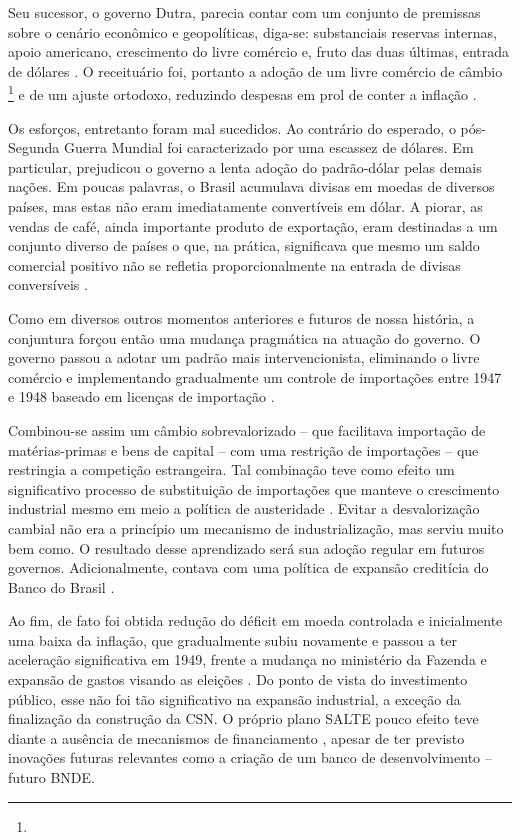 Seu sucessor, o governo Dutra, parecia contar com um conjunto de premissas
sobre o cenário econômico e geopolíticas, diga-se: substanciais reservas internas, apoio
americano, crescimento do livre comércio e, fruto das duas últimas,
entrada de dólares \citep{vianna_o_2025}. O receituário foi, portanto a
adoção de um livre comércio de câmbio \footnote{} e de um ajuste ortodoxo,
reduzindo despesas em prol de conter a inflação .

Os esforços, entretanto foram mal sucedidos. Ao contrário do esperado, o
pós-Segunda Guerra Mundial foi caracterizado por uma escassez de
dólares. Em particular, prejudicou o governo a lenta adoção do
padrão-dólar pelas demais nações. Em poucas palavras, o Brasil acumulava
divisas em moedas de diversos países, mas estas não eram imediatamente
convertíveis em dólar. A piorar, as vendas de café, ainda importante
produto de exportação, eram destinadas a um conjunto diverso de países o
que, na prática, significava que mesmo um saldo comercial positivo não
se refletia proporcionalmente na entrada de divisas conversíveis \citep[]{vianna_o_2025}.

Como em diversos outros momentos anteriores e futuros de nossa história,
a conjuntura forçou então uma mudança pragmática na atuação do governo.
O governo passou a adotar um padrão mais intervencionista, eliminando o
livre comércio e implementando gradualmente um controle de importações
entre 1947 e 1948 baseado em licenças de importação \citep[]{vianna_o_2025}.

Combinou-se assim um câmbio sobrevalorizado -- que facilitava importação
de matérias-primas e bens de capital -- com uma restrição de importações
-- que restringia a competição estrangeira. Tal combinação teve como
efeito um significativo processo de substituição de importações que
manteve o crescimento industrial mesmo em meio a política de austeridade
\citep{vianna_o_2025}. Evitar a desvalorização cambial não era a princípio
um mecanismo de industrialização, mas serviu muito bem como. O resultado
desse aprendizado será sua adoção regular em futuros governos.
Adicionalmente, contava com uma política de expansão creditícia do Banco
do Brasil \citep{vianna_o_2025}.

Ao fim, de fato foi obtida redução do déficit em moeda controlada e
inicialmente uma baixa da inflação, que gradualmente subiu novamente e
passou a ter aceleração significativa em 1949, frente a mudança no
ministério da Fazenda e expansão de gastos visando as eleições \citep[]{vianna_o_2025}. 
Do ponto de vista do investimento público, esse não foi tão
significativo na expansão industrial, a exceção da finalização da
construção da CSN. O próprio plano SALTE pouco efeito teve diante a
ausência de mecanismos de financiamento \citep[]{vianna_o_2025}, apesar de ter previsto
inovações futuras relevantes como a criação de um banco de
desenvolvimento -- futuro BNDE.


